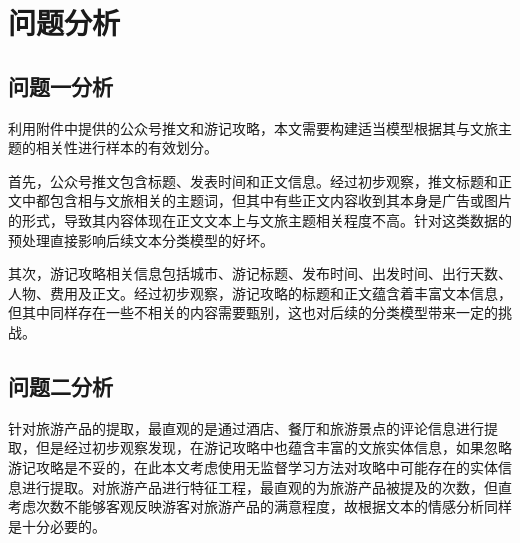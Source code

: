 \documentclass[bwprint]{gmcmthesis}
\begin{document}

\section{问题分析}

\subsection{问题一分析}
利用附件中提供的公众号推文和游记攻略，本文需要构建适当模型根据其与文旅主题的相关性进行样本的有效划分。

首先，公众号推文包含标题、发表时间和正文信息。经过初步观察，推文标题和正文中都包含相与文旅相关的主题词，但其中有些正文内容收到其本身是广告或图片的形式，导致其内容体现在正文文本上与文旅主题相关程度不高。针对这类数据的预处理直接影响后续文本分类模型的好坏。

其次，游记攻略相关信息包括城市、游记标题、发布时间、出发时间、出行天数、人物、费用及正文。经过初步观察，游记攻略的标题和正文蕴含着丰富文本信息，但其中同样存在一些不相关的内容需要甄别，这也对后续的分类模型带来一定的挑战。


\subsection{问题二分析}
针对旅游产品的提取，最直观的是通过酒店、餐厅和旅游景点的评论信息进行提取，但是经过初步观察发现，在游记攻略中也蕴含丰富的文旅实体信息，如果忽略游记攻略是不妥的，在此本文考虑使用无监督学习方法对攻略中可能存在的实体信息进行提取。对旅游产品进行特征工程，最直观的为旅游产品被提及的次数，但直考虑次数不能够客观反映游客对旅游产品的满意程度，故根据文本的情感分析同样是十分必要的。
\end{document}
